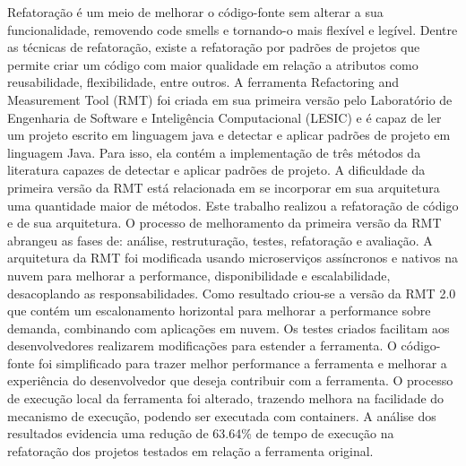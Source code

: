 \begin{Abstract}[brazilian]%
Refatoração é um meio de melhorar o código-fonte sem alterar a sua funcionalidade, removendo code smells e tornando-o mais flexível e legível. Dentre as técnicas de refatoração, existe a refatoração por padrões de projetos que permite criar um código com maior qualidade em relação a atributos como reusabilidade, flexibilidade, entre outros. A ferramenta Refactoring and Measurement Tool (RMT) foi criada em sua primeira versão pelo Laboratório de Engenharia de Software e Inteligência Computacional (LESIC) e é capaz de ler um projeto escrito em linguagem java e detectar e aplicar padrões de projeto em linguagem Java. Para isso, ela contém a implementação de três métodos da literatura capazes de detectar e aplicar padrões de projeto. A dificuldade da primeira versão da RMT está relacionada em se incorporar em sua arquitetura uma quantidade maior de métodos. Este trabalho realizou a refatoração de código e de sua arquitetura. O processo de melhoramento da primeira versão da RMT abrangeu as fases de: análise, restruturação, testes, refatoração e avaliação. A arquitetura da RMT foi modificada usando microserviços assíncronos e nativos na nuvem para melhorar a performance, disponibilidade e escalabilidade, desacoplando as responsabilidades. Como resultado criou-se a versão da RMT 2.0 que contém um escalonamento horizontal para melhorar a performance sobre demanda, combinando com aplicações em nuvem. Os testes criados facilitam aos desenvolvedores realizarem modificações para estender a ferramenta. O código-fonte foi simplificado para trazer melhor performance a ferramenta e melhorar a experiência do desenvolvedor que deseja contribuir com a ferramenta. O processo de execução local da ferramenta foi alterado, trazendo melhora na facilidade do mecanismo de execução, podendo ser executada com containers. A análise dos resultados evidencia uma redução de 63.64\% de tempo de execução na refatoração dos projetos testados em relação a ferramenta original.

\end{Abstract}
